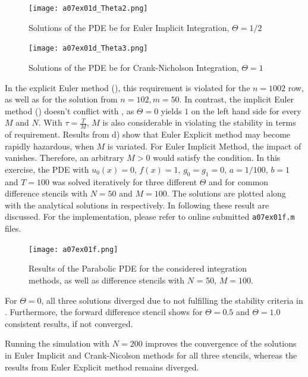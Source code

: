 \begin{figure}[H]
\vspace*{\FigUpperVSpace}
	\texttt{[image: a07ex01d\_Theta2.png]} 
	\caption{Solutions of the PDE be for Euler Implicit Integration, $\Theta = 1/2$}
	\label{fig:a07ex01d_Theta2}
\end{figure}
%
\vfill
%
\begin{figure}[H]
\vspace*{\FigUpperVSpace}
	\texttt{[image: a07ex01d\_Theta3.png]} 
	\caption{Solutions of the PDE be for Crank-Nicholson Integration, $\Theta = 1$}
	\label{fig:a07ex01d_Theta3}
\end{figure}
In the explicit Euler method (), this requirement is violated for the $n=1002$ row, as well as for the solution from $n=102, m = 50$.
In contrast, the implicit Euler method () doesn't conflict with , as $\Theta = 0$ yields $1$ on the left hand side for every $M$ and $N$.
%
With $\tau = \frac{T}{M}$, $M$ is also considerable in violating the stability in terms of  requirement.
Results from d) show that Euler Explicit method may become rapidly hazardous, when $M$ is variated.
For Euler Implicit Method, the impact of vanishes.
Therefore, an arbitrary $M>0$ would satisfy the condition.
%
In this exercise, the PDE with $u_0(x) = 0$, $f(x) = 1$, $g_0 = g_1 = 0$, $a = 1/100$, $b = 1$ and $T = 100$ was solved iteratively for three different $\Theta$ and for common difference stencils with $N = 50$ and $M=100$.
The solutions are plotted along with the analytical solutions in  respectively.
In following these result are discussed.
For the implementation, please refer to online submitted \texttt{a07ex01f.m} files.
\begin{figure}[H]
\vspace*{\FigUpperVSpace}
	\texttt{[image: a07ex01f.png]} 
	\caption{Results of the Parabolic PDE for the considered integration methods, as well as difference stencils with $N$ = 50, $M = 100$.}
	\label{fig:a07ex01f}
\end{figure}
For $\Theta = 0$, all three solutions diverged due to not fulfilling the stability criteria in .
Furthermore, the forward difference stencil shows for $\Theta = 0.5$ and $\Theta = 1.0$ consistent results, if not converged.
\par
Running the simulation with $N = 200$ improves the convergence of the solutions in Euler Implicit and Crank-Nicolson methods for all three stencils, whereas the results from Euler Explicit method remains diverged.
%

